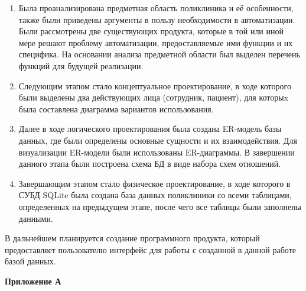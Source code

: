 \documentclass[14pt,a4paper,russian]{extreport}
\begin{document}
\begin{enumerate}[noitemsep]
        \vspace{-5pt}
    \item Была проанализирована предметная область поликлиника и её особенности, также были
        приведены аргументы в пользу необходимости в автоматизации. Были рассмотрены две существующих
        продукта, которые в той или иной мере решают проблему автоматизации, предоставляемые ими
        функции и их специфика. На основании анализа предметной области был выделен перечень
        функций для будущей реализации.
    \item Следующим этапом стало концептуальное проектирование, в ходе которого были выделены
        два 
        действующих лица (сотрудник, пациент), для которыx была составлена
        диаграмма вариантов использования.
    \item Далее в ходе логического проектирования была создана ER-модель базы данных, где были
        определены основные сущности и их взаимодействия. Для визуализации ER-модели были
        использованы ER-диаграммы. В завершении данного этапа были построена схема БД в виде набора
        схем отношений.
    \item Завершающим этапом стало физическое проектирование, в ходе которого в СУБД SQLite была
        создана база данных поликлиники со всеми таблицами, определенных на предыдущем этапе, после
        чего все таблицы были заполнены данными.
\end{enumerate}
    В дальнейшем планируется создание программного продукта, который предоставляет
        пользователю интерфейс для работы с созданной в данной работе базой данных.

{}

\newpage
\hfill\textbf{Приложение А}
\setcounter{lstlisting}{0}





\newpage




\newpage





\end{document}
